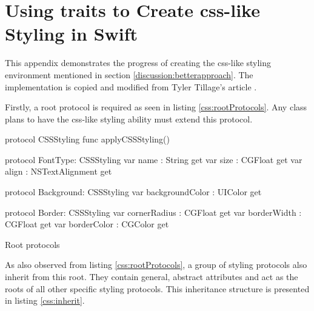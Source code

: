 \documentclass[11pt,a4paper,oneside,article]{memoir}
\begin{document}
\setcounter{page}{1}


\chapter{Using \glspl{trait} to Create \gls{css}-like Styling in Swift} 
This appendix demonstrates the progress of creating the \gls{css}-like styling environment mentioned in section \ref{discussion:betterapproach}. The implementation is copied and modified from Tyler Tillage's article \cite{pop:uikit}.

Firstly, a root protocol is required as seen in listing \ref{css:rootProtocols}. Any class plans to have the \gls{css}-like styling ability must extend this protocol.

\label{source:code}

\begin{listing}[H]
\begin{SwiftCode}
protocol CSSStyling {
    func applyCSSStyling()
}

protocol FontType: CSSStyling {
    var name : String { get }
    var size : CGFloat { get }
    var align : NSTextAlignment { get }
}

protocol Background: CSSStyling {
    var backgroundColor : UIColor { get }
}

protocol Border: CSSStyling {
    var cornerRadius : CGFloat { get }
    var borderWidth : CGFloat { get }
    var borderColor : CGColor { get }
}
\end{SwiftCode}
\caption{Root protocols}
\label{css:rootProtocols}
\end{listing}

As also observed from listing \ref{css:rootProtocols}, a group of styling protocols also inherit from this root. They contain general, abstract attributes and act as the roots of all other specific styling protocols. This inheritance structure is presented in listing \ref{css:inherit}.
\end{document}
